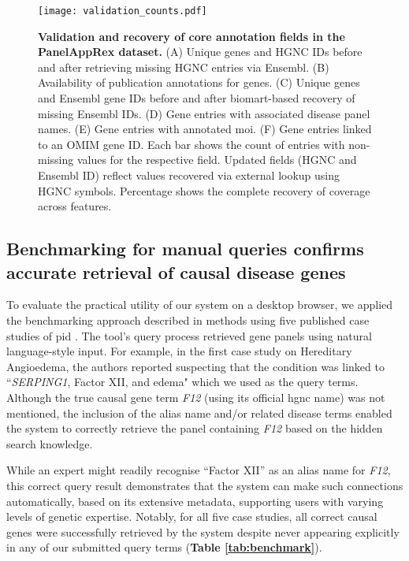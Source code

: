 \begin{figure}[ht]
    \centering
    \texttt{[image: validation\_counts.pdf]}
\caption{\textbf{Validation and recovery of core annotation fields in the PanelAppRex dataset.}
(A) Unique genes and HGNC IDs before and after retrieving missing HGNC entries via Ensembl.
(B) Availability of publication annotations for genes.
(C) Unique genes and Ensembl gene IDs before and after biomart-based recovery of missing Ensembl IDs.
(D) Gene entries with associated disease panel names.
(E) Gene entries with annotated \ac{moi}.
(F) Gene entries linked to an OMIM gene ID.
Each bar shows the count of entries with non-missing values for the respective field. Updated fields (HGNC and Ensembl ID) reflect values recovered via external lookup using HGNC symbols. Percentage shows the complete recovery of coverage across features.
}
    \label{fig:validation}
\end{figure}

\subsection{Benchmarking for manual queries confirms accurate retrieval of causal disease genes}
\noindent
To evaluate the practical utility of our system on a desktop browser, we applied the benchmarking approach described in methods using five published case studies of \ac{pid}
\cite{arruda_genetic_2015, 
mcaleer_severe_2015,
verhoeven_hematopoietic_2022,
magerus-chatinet_autoimmune_2013,
sharfe_fatal_2014}. %
The tool's query process retrieved gene panels using natural language-style input. 
For example, in the first case study on Hereditary Angioedema, the authors reported suspecting that the condition was linked to ``\textit{SERPING1}, Factor XII, and edema" which we used as the query terms. 
Although the true causal gene term \textit{F12} (using its official \ac{hgnc} name) was not mentioned, the inclusion of the alias name and/or related disease terms enabled the system to correctly retrieve the panel containing \textit{F12} based on the hidden search knowledge.

While an expert might readily recognise ``Factor XII'' as an alias name for \textit{F12}, this correct query result demonstrates that the system can make such connections automatically, based on its extensive metadata, supporting users with varying levels of genetic expertise.
Notably, for all five case studies, all correct causal genes were successfully retrieved by the system despite never appearing explicitly in any of our submitted query terms (\textbf{Table \ref{tab:benchmark}}).

